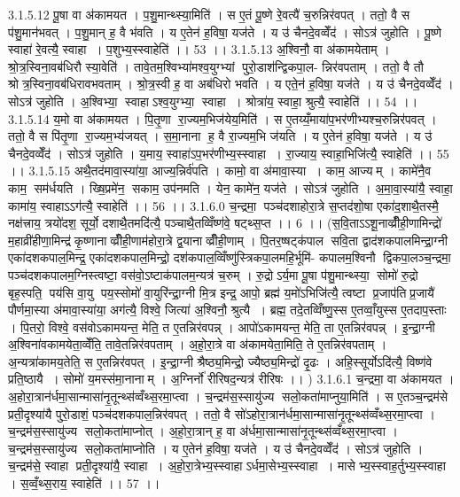 3.1.5.12
पू॒षा वा अ॑कामयत । प॒शु॒मान्थ्स्या॒मिति॑ । स ए॒तं पू॒ष्णे रे॒वत्यै॑ च॒रुन्निर॑वपत् । ततो॒ वै स प॑शु॒मान॑भवत् । प॒शु॒मान् ह॒ वै भ॑वति । य ए॒तेन॑ ह॒विषा॒ यज॑ते । य उ॑ चैनदे॒वव्वेँद॑ । सोऽत्र॑ जुहोति । पू॒ष्णे स्वाहा॑ रे॒वत्यै॒ स्वाहा । प॒शुभ्य॒स्स्वाहेति॑ ।। 53 ।।
3.1.5.13
अ॒श्विनौ॒ वा अ॑कामयेताम् । श्रो॒त्र॒स्विना॒वब॑धिरौ स्या॒वेति॑ । तावे॒तम॒श्विभ्या॑मश्व॒युग्भ्यां पुरो॒डाश॑न्द्विकपा॒ल- न्निर॑वपताम् । ततो॒ वै तौ श्रोत्र॒स्विना॒वब॑धिरावभवताम् । श्रो॒त्र॒स्वी ह॒ वा अब॑धिरो भवति । य एते॒न॑ ह॒विषा॒ यज॑ते । य उ॑ चैनदे॒वव्वेँद॑ । सोऽत्र॑ जुहोति । अ॒श्विभ्या॒॒ स्वाहाऽश्व॒युग्भ्या॒॒ स्वाहा । श्रोत्रा॑य॒ स्वाहा॒ श्रुत्यै॒ स्वाहेति॑ ।। 54 ।।
3.1.5.14
य॒मो वा अ॑कामयत । पि॒तृ॒णा रा॒ज्यम॒भिज॑येय॒मिति॑ । स ए॒तय्यँ॒माया॑प॒भर॑णीभ्यश्च॒रुन्निर॑पवत् । ततो॒ वै स पि॑तृ॒णा रा॒ज्यम॒भ्य॑जयत् । स॒मा॒नाना॑ ह॒ वै रा॒ज्यम॒भि ज॑यति । य ए॒तेन॑ ह॒विषा॒ यज॑ते । य उ॑ चैनदे॒वव्वेँद॑ । सोऽत्र॑ जुहोति । य॒माय॒ स्वाहा॑ऽप॒भर॑णीभ्य॒स्स्वाहा । रा॒ज्याय॒ स्वाहा॒भिजि॑त्यै॒ स्वाहेति॑ ।। 55 ।।
3.1.5.15
अथै॒तद॑मावा॒स्या॑या॒ आज्य॒न्निर्व॑पति । कामो॒ वा अ॑मावा॒स्या । काम॒ आज्यम् । कामे॑नै॒व काम॒॒ सम॑र्धयति । ख्षि॒प्रमे॑न॒॒ सकाम॒ उप॑नमति । येन॒ कामे॑न॒ यज॑ते । सोऽत्र॑ जुहोति । अ॒मा॒वा॒स्या॑यै॒ स्वाहा॒ कामा॑य॒ स्वाहाऽऽग॑त्यै॒ स्वाहेति॑ ।। 56 ।।
3.1.6.0
च॒न्द्रमा॒ पञ्च॑दशाहोरा॒त्रे स॒प्तद॑शो॒षा एका॑द॒शाथै॒तस्मै॒ नक्ष॑त्त्राय॒ त्रयो॑दश॒ सूर्यो॒ दशाथै॒तमदि॑त्यै॒ पञ्चाथै॒तव्विँष्ण॑वे॒ षट्थ्स॒प्त ।। 6 ।। (स॒वि॒ताऽऽशू॒नाव्व्रीँ॑ही॒णामिन्द्रो॑ म॒हाव्री॑हीणा॒मिन्द्र॑कृ॒ष्णानाव्व्रीँही॒णाम॑होरा॒त्रे द्व॒यानाव्व्रीँही॒णाम् । पि॒तर॒ष्षट्क॑पाल सवि॒ता द्वाद॑शकपालमिन्द्रा॒ग्नी एका॑दशकपाल॒मिन्द्र॒ एका॑दशकपाल॒मिन्द्रो॒ दश॑कपाल॒व्विँष्णु॑स्त्रिकपा॒लमहि॒र्भूमि॑- कपालम॒श्विनौ द्विकपा॒लञ्च॒न्द्रमा॒ पञ्च॑दशकपालम॒ग्निस्त्वष्टा॒ वस॑वो॒ऽष्टाक॑पालम॒न्यत्र॑ च॒रुम् । रु॒द्रोऽर्य॒मा पू॒षा प॑शु॒मान्थ्स्या॒॒ सोमो॑ रु॒द्रो बृह॒स्पति॒ पय॑सि वा॒यु पय॒स्सोमो॑ वा॒युरि॑न्द्रा॒ग्नी मि॒त्र इन्द्र॒ आपो॒ ब्रह्म॑ य॒मो॑ऽभिजि॑त्यै॒ त्वष्टा प्र॒जाप॑तिप्र॒जायै॑ पौर्णमा॒स्या अ॑मावा॒स्या॑या॒ अग॑त्यै॒ विश्वे॒ जित्या॑ अ॒श्विनौ॒ श्रुत्यै । ब्रह्म॒ तदे॒तव्विँष्णु॒स्स ए॒तव्वाँ॒युस्स ए॒तदाप॒स्ताः । पि॒तरो॒ विश्वे॒ वस॑वोऽकामयन्त॒ मेति॒ त ए॒तन्निर॑वपन्न् । आपो॑ऽकामयन्त॒ मेति॒ ता ए॒तन्निर॑वपन्न् । इ॒न्द्रा॒ग्नी अ॒श्विना॑वकामयेता॒व्वेँति॒ तावे॒तन्निर॑वपताम् । अ॒हो॒रा॒त्रे वा अ॑कामयेता॒मिति॒ ते ए॒तन्निर॑वपताम् । अ॒न्यत्रा॑कामय॒तेति॒ स ए॒तन्निर॑वपत् । इ॒न्द्रा॒ग्नी श्रैष्ठ्य॒मिन्द्रो॒ ज्यैष्ठ्य॒मिन्द्रो॑ दृ॒ढः । अहि॒स्सूर्योऽदि॑त्यै॒ विष्ण॑वे प्रति॒ष्ठायै । सोमो॑ य॒मस्स॑मा॒नानाम् । अ॒ग्निर्नो॑ रीरिषद॒न्यत्र॑ रीरिषः ।। )
3.1.6.1
च॒न्द्रमा॒ वा अ॑कामयत । अ॒होरा॒त्रान॑र्धमा॒सान्मासा॑नृ॒तून्थ्स॑व्वँथ्स॒रमा॒प्त्वा । च॒न्द्रम॑स॒स्सायु॑ज्य सलो॒कता॑माप्नुया॒मिति॑ । स ए॒तञ्च॒न्द्रम॑से प्रती॒दृश्या॑यै पुरो॒डाशं॒ पञ्च॑दशकपाल॒न्निर॑वपत् । ततो॒ वै सो॑ऽहोरा॒त्रान॑र्धमा॒सान्मासा॑नृ॒तून्थ्स॑व्वँथ्स॒रमा॒प्त्वा । च॒न्द्रम॑स॒स्सायु॑ज्य सलो॒कता॑माप्नोत् । अ॒हो॒रा॒त्रान् ह॒ वा अ॑र्धमा॒सान्मासा॑नृ॒तून्थ्स॑व्वँथ्स॒रमा॒प्त्वा । च॒न्द्रम॑स॒स्सायु॑ज्य सलो॒कता॑माप्नोति । य ए॒तेन॑ ह॒विषा॒ यज॑ते । य उ॑ चैनदे॒वव्वेँद॑ । सोऽत्र॑ जुहोति । च॒न्द्रम॑से॒ स्वाहा प्रती॒दृश्या॑यै॒ स्वाहा । अ॒हो॒रा॒त्रेभ्य॒स्स्वाहाऽर्धमा॒सेभ्य॒स्स्वाहा । मासेभ्य॒स्स्वाह॒र्तुभ्य॒स्स्वाहा । स॒व्वँ॒थ्स॒राय॒ स्वाहेति॑ ।। 57 ।।
